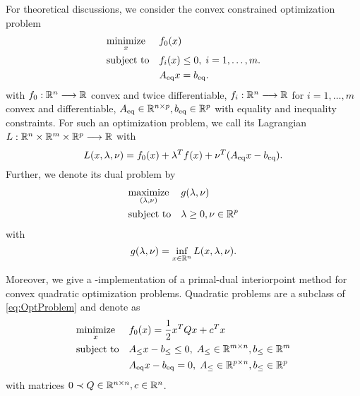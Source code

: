 For theoretical discussions, we consider the convex constrained optimization problem
\begin{equation}
\OptProblem
\label{eq:OptProblem}
\end{equation}
with $ f_0:\mathbb{R}^n \longrightarrow \mathbb{R} $ convex and twice differentiable, $ f_i:\mathbb{R}^n \longrightarrow \mathbb{R} $ for $ i=1,\dots,m $ convex and differentiable,
$ {A}_{\mathrm{eq}} \in \mathbb{R}^{n\times p}, {b}_{\mathrm{eq}} \in  \mathbb{R}^p $ with equality and inequality constraints. For such an optimization problem, we call its Lagrangian $ L:\mathbb{R}^n \times \mathbb{R}^m \times \mathbb{R}^p \longrightarrow \mathbb{R} $
with  \[ L(x,\lambda,\nu) = f_0(x) + \lambda^T f(x) + \nu ^T ({A}_{\mathrm{eq}} x - {b}_{\mathrm{eq}}).  \]
Further, we denote its dual problem by
\begin{equation}
	\OptProblemDual
	\label{eq:OptProblemDual}
\end{equation}
with \[ g(\lambda, \nu) = \inf_{x\in \mathbb{R}^n} L(x,\lambda,\nu). \]



Moreover, we give a \matlab-implementation of a primal-dual interiorpoint method for  convex quadratic optimization problems. Quadratic problems are a subclass of \eqref{eq:OptProblem} and denote as
\begin{equation}
	\OptProblemquad
	\label{eq:QuadProblem}
\end{equation}
with matrices $ 0 \prec Q\in \mathbb{R}^{n \times n}, c\in \mathbb{R}^n $.  